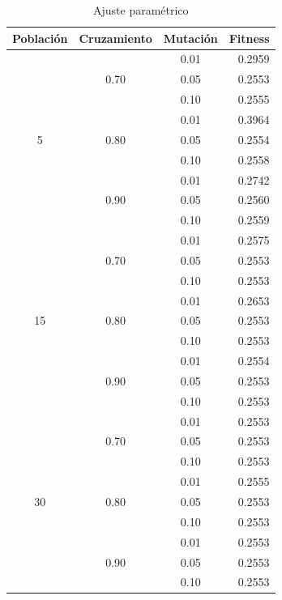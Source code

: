 \documentclass[journal]{IEEEtran}
\begin{document}
\begin{table}[h]
\caption{Ajuste paramétrico}
\centering
\begin{tabular}{|c|c|c||r|}
\hline
Población &Cruzamiento &Mutación &Fitness \\
\hline
\multirow{9}{*}{5}  & \multirow{3}{*}{0.70} & 0.01 & 0.2959 \\
                    &                       & 0.05 & 0.2553 \\
                    &                       & 0.10 & 0.2555\\ \cline{2-4}
                    & \multirow{3}{*}{0.80} & 0.01 & 0.3964 \\
                    &                       & 0.05 & 0.2554 \\
                    &                       & 0.10 & 0.2558 \\ \cline{2-4}
                    & \multirow{3}{*}{0.90} & 0.01 & 0.2742 \\
                    &                       & 0.05 & 0.2560 \\
                    &                       & 0.10 & 0.2559 \\ \hline
\multirow{9}{*}{15} & \multirow{3}{*}{0.70} & 0.01 & 0.2575 \\
                    &                       & 0.05 & 0.2553 \\
                    &                       & 0.10 & 0.2553 \\ \cline{2-4}
                    & \multirow{3}{*}{0.80} & 0.01 & 0.2653 \\
                    &                       & 0.05 & 0.2553 \\
                    &                       & 0.10 & 0.2553 \\ \cline{2-4}
                    & \multirow{3}{*}{0.90} & 0.01 & 0.2554 \\
                    &                       & 0.05 & 0.2553 \\
                    &                       & 0.10 & 0.2553 \\ \hline
\multirow{9}{*}{30} & \multirow{3}{*}{0.70} & 0.01 & 0.2553 \\
                    &                       & 0.05 & 0.2553 \\
                    &                       & 0.10 & 0.2553 \\ \cline{2-4}
                    & \multirow{3}{*}{0.80} & 0.01 & 0.2555 \\
                    &                       & 0.05 & 0.2553 \\
                    &                       & 0.10 & 0.2553 \\ \cline{2-4}
                    & \multirow{3}{*}{0.90} & 0.01 & 0.2553 \\
                    &                       & 0.05 & 0.2553 \\
                    &                       & 0.10 & 0.2553 \\ \hline
\end{tabular}
\label{tab:tuning}
\end{table}
\end{document}
